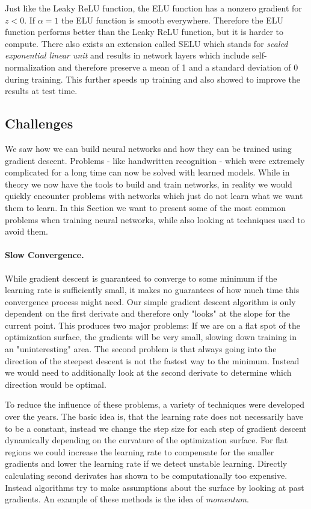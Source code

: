 \begin{enumerate}
  Just like the Leaky ReLU function, the ELU function has a nonzero gradient for $z < 0$. If $\alpha = 1$ the ELU function is smooth everywhere. Therefore the ELU function performs better than the Leaky ReLU function, but it is harder to compute. \cite{clevert2015fast} There also exists an extension called SELU which stands for \textit{scaled exponential linear unit} \cite{klambauer2017self} and results in network layers which include self-normalization and therefore preserve a mean of 1 and a standard deviation of 0 during training. This further speeds up training and also showed to improve the results at test time.
  
\end{enumerate}

\subsection{Challenges} \label{sec:NNChallenges}
We saw how we can build neural networks and how they can be trained using gradient descent. Problems - like handwritten recognition - which were extremely complicated for a long time can now be solved with learned models. While in theory we now have the tools to build and train networks, in reality we would quickly encounter problems with networks which just do not learn what we want them to learn. In this Section we want to present some of the most common problems when training neural networks, while also looking at techniques used to avoid them.

\paragraph{Slow Convergence.}
While gradient descent is guaranteed to converge to some minimum if the learning rate is sufficiently small, it makes no guarantees of how much time this convergence process might need. Our simple gradient descent algorithm is only dependent on the first derivate and therefore only "looks" at the slope for the current point. This produces two major problems: If we are on a flat spot of the optimization surface, the gradients will be very small, slowing down training in an "uninteresting" area. The second problem is that always going into the direction of the steepest descent is not the fastest way to the minimum. Instead we would need to additionally look at the second derivate to determine which direction would be optimal. 

To reduce the influence of these problems, a variety of techniques were developed over the years. The basic idea is, that the learning rate does not necessarily have to be a constant, instead we change the step size for each step of gradient descent dynamically depending on the curvature of the optimization surface. For flat regions we could increase the learning rate to compensate for the smaller gradients and lower the learning rate if we detect unstable learning. Directly calculating second derivates has shown to be computationally too expensive. Instead algorithms try to make assumptions about the surface by looking at past gradients. An example of these methods is the idea of \textit{momentum}. 

